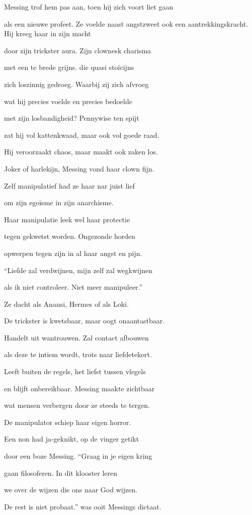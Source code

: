 Messing trof hem pas aan,
toen hij zich voort liet gaan

als een nieuwe profeet.
Ze voelde naast angstzweet
ook een aantrekkingskracht.
Hij kreeg haar in zijn macht

door zijn trickster aura.
Zijn clownesk charisma

met een te brede grijns.
die quasi stoïcijns

zich loszinnig gedroeg.
Waarbij zij zich afvroeg

wat hij precies voelde
en precies bedoelde

met zijn losbandigheid?
Pennywise ten spijt

zat hij vol kattenkwaad,
maar ook vol goede raad.

Hij veroorzaakt chaos,
maar maakt ook zaken los.

Joker of harlekijn,
Messing vond haar clown fijn.

Zelf manipulatief
had ze haar nar juist lief

om zijn egoïsme
in zijn anarchisme.

Haar manipulatie
leek wel haar protectie

tegen gekwetst worden.
Ongezonde horden

opwerpen tegen zijn
in al haar angst en pijn.

“Liefde zal verdwijnen,
mijn zelf zal wegkwijnen

als ik niet controleer.
Niet meer manipuleer.”

Ze dacht als Anansi,
Hermes of als Loki.

De trickster is kwetsbaar,
maar oogt onaantastbaar.

Handelt uit wantrouwen.
Zal contact afbouwen

als deze te intiem wordt,
trots naar liefdetekort.

Leeft buiten de regels,
het liefst tussen vlegels

en blijft onbereikbaar.
Messing maakte zichtbaar

wat mensen verbergen
door ze steeds te tergen.

De manipulator
schiep haar eigen horror.

Een non had ja-geknikt,
op de vinger getikt

door een boze Messing.
“Graag in je eigen kring

gaan filosoferen.
In dit klooster leren

we over de wijzen
die ons naar God wijzen.

De rest is niet probaat.”
was ooit Messings dictaat.

